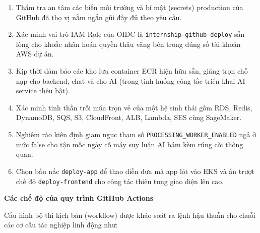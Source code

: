 \begin{enumerate}
\def\labelenumi{\arabic{enumi}.}
\tightlist
\item
  Thẩm tra an tâm các biến môi trường và bí mật (secrets) production của
  GitHub đã thọ vị nằm ngắn gũi đầy đủ theo yêu cầu.
\item
  Xác minh vai trò IAM Role của OIDC là
  \texttt{internship-\allowbreak{}github-\allowbreak{}deploy} sẵn lòng cho khoắc nhãn hoán quyền
  thâu vãng bên trong đúng số tài khoản AWS dự án.
\item
  Kịp thời đảm bảo các kho lưu container ECR hiện hữu sẵn, giăng trọn
  chỗ nạp cho backend, chat và cho AI (trong tình huống công tắc triển
  khai AI service thêu bật).
\item
  Xác minh tinh thần trỗi múa trọn vẻ của một hệ sinh thái gồm RDS,
  Redis, DynamoDB, SQS, S3, CloudFront, ALB, Lambda, SES cùng SageMaker.
\item
  Nghiêm rào kiên định giam ngục tham số
  \texttt{PROCESSING\_\allowbreak{}WORKER\_\allowbreak{}ENABLED} ngả ở mức false cho tận mốc ngày
  cỗ máy suy luận AI bám kèm rúng còi thông quan.
\item
  Chọn bấu nấc \texttt{deploy-\allowbreak{}app} để thao diễn đưa mã app lót vào EKS
  và ấn trượt chế độ \texttt{deploy-\allowbreak{}frontend} cho công tác thiêu tung
  giao diện lên cao.
\end{enumerate}

\vspace{0.5em}\noindent\textbf{Các chế độ của quy trình GitHub
Actions}\par

Cấu hình bộ thi kịch bản (workflow) được khảo soát ra lệnh hậu thuẫn cho
chuỗi các cơ cấu tác nghiệp linh động như:

